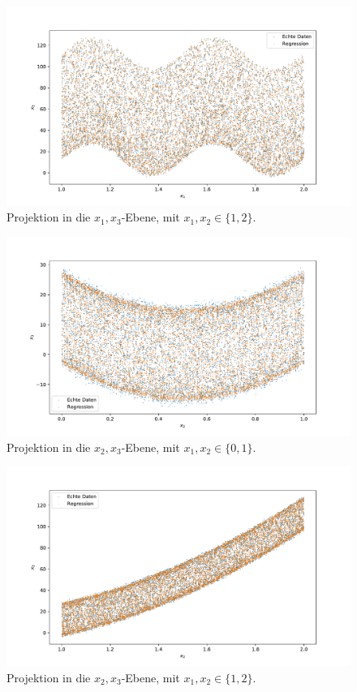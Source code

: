\documentclass[a4paper, 11pt]{article}
\begin{document}
\begin{figure}
    \centering
    \includegraphics[width=\textwidth]{../A20/A20_x1_x3_f.pdf}
    \caption{Projektion in die $x_1, x_3$-Ebene, mit $x_1, x_2\in\{1, 2\}$.}
\end{figure}

\begin{figure}
    \centering
    \includegraphics[width=\textwidth]{../A20/A20_x2_x3_e.pdf}
    \caption{Projektion in die $x_2, x_3$-Ebene, mit $x_1, x_2\in\{0, 1\}$.}
\end{figure}

\begin{figure}
    \centering
    \includegraphics[width=\textwidth]{../A20/A20_x2_x3_f.pdf}
    \caption{Projektion in die $x_2, x_3$-Ebene, mit $x_1, x_2\in\{1, 2\}$.}
\end{figure}
\end{document}
